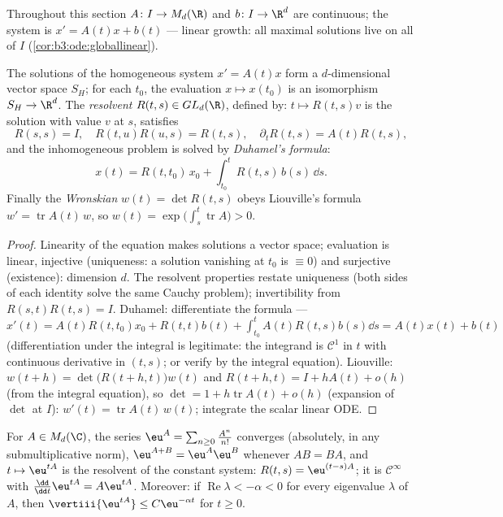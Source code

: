 Throughout this section $A \colon I \to M_d(\R)$ and $b
\colon I \to \R^d$ are continuous; the system is $x' = A(t)x
+ b(t)$ --- linear growth: all maximal solutions live on all
of $I$ (\cref{cor:b3:ode:globallinear}).

\begin{theorem}[Structure]\label{thm:b3:ode:linearstructure}
The solutions of the homogeneous system $x' = A(t)x$ form a
$d$-dimensional vector space $S_H$; for each $t_0$, the
evaluation $x \mapsto x(t_0)$ is an isomorphism $S_H \to
\R^d$. The \emph{resolvent} $R(t, s) \in GL_d(\R)$, defined by: $t \mapsto R(t,
s)v$ is the solution with value $v$ at $s$, satisfies
\[
R(s,s) = I,\quad R(t, u)R(u, s) = R(t, s),\quad
\partial_tR(t,s) = A(t)R(t,s),
\]
and the inhomogeneous problem is solved by \emph{Duhamel's
formula}:
\[
x(t) = R(t, t_0)\,x_0 + \int_{t_0}^{t}R(t, s)\,b(s)\,\dd s .
\]
Finally the \emph{Wronskian} $w(t) = \det
R(t, s)$ obeys Liouville's formula $w' =
\operatorname{tr}A(t)\,w$, so $w(t) =
\exp\bigl(\int_s^t\operatorname{tr}A\bigr) > 0$.
\end{theorem}

\begin{proof}
Linearity of the equation makes solutions a vector space;
evaluation is linear, injective (uniqueness: a solution
vanishing at $t_0$ is $\equiv 0$) and surjective (existence):
dimension $d$. The resolvent properties restate uniqueness
(both sides of each identity solve the same Cauchy problem);
invertibility from $R(s,t)R(t,s) = I$. Duhamel: differentiate
the formula --- $x'(t) = A(t)R(t,t_0)x_0 + R(t,t)b(t) +
\int_{t_0}^tA(t)R(t,s)b(s)\dd s = A(t)x(t) + b(t)$
(differentiation under the integral is legitimate: the
integrand is $\mathcal C^1$ in $t$ with continuous derivative
in $(t,s)$; or verify by the integral equation). Liouville:
$w(t + h) = \det\bigl(R(t+h, t)\bigr)w(t)$ and $R(t + h, t) =
I + hA(t) + o(h)$ (from the integral equation), so $\det = 1
+ h\operatorname{tr}A(t) + o(h)$ (expansion of $\det$ at
$I$): $w'(t) = \operatorname{tr}A(t)\,w(t)$; integrate the
scalar linear ODE.
\end{proof}

\begin{theorem}\label{thm:b3:ode:matrixexp}
For $A \in M_d(\C)$, the series $\eu^{A} =
\sum_{n\geq0}\frac{A^n}{n!}$ converges (absolutely, in any
submultiplicative norm), $\eu^{A+B} = \eu^A\eu^B$ whenever
$AB = BA$, and $t \mapsto \eu^{tA}$ is the resolvent of the
constant system: $R(t,s) = \eu^{(t-s)A}$; it is $\mathcal
C^\infty$ with $\frac{\dd}{\dd t}\eu^{tA} = A\eu^{tA}$.
Moreover: if $\operatorname{Re}\lambda < -\alpha < 0$ for
every eigenvalue $\lambda$ of $A$, then $\vertiii{\eu^{tA}}
\leq C\eu^{-\alpha t}$ for $t \geq 0$.
\end{theorem}

